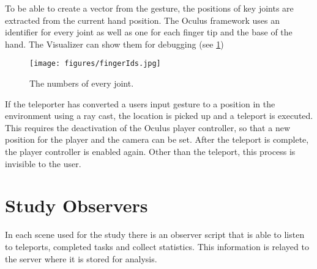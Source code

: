 To be able to create a vector from the gesture, the positions of key joints are extracted from the current hand position. The Oculus framework uses an identifier for every joint as well as one for each finger tip and the base of the hand. The Visualizer can show them for debugging (see \ref{fig:fingerIds})

\begin{figure}[!h]
    \centering
    \texttt{[image: figures/fingerIds.jpg]}
    \caption{The numbers of every joint.}
    \label{fig:fingerIds}
\end{figure}


If the teleporter has converted a users input gesture to a position in the environment using a ray cast, the location is picked up and a teleport is executed. This requires the deactivation of the Oculus player controller, so that a new position for the player and the camera can be set. After the teleport is complete, the player controller is enabled again. Other than the teleport, this process is invisible to the user. 

\section{Study Observers}
In each scene used for the study there is an observer script that is able to listen to teleports, completed tasks and collect statistics. This information is relayed to the server where it is stored for analysis.
